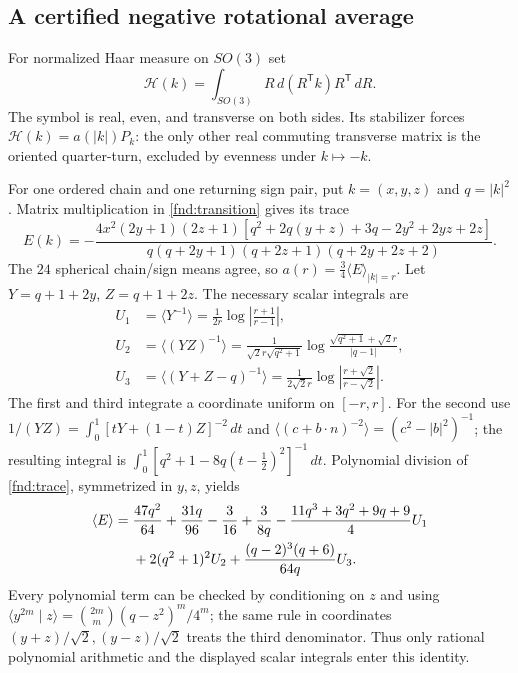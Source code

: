 \documentclass[11pt,a4paper]{amsart}
\theoremstyle{definition}
\theoremstyle{remark}
\numberwithin{equation}{section}
\begin{document}
\subsection{A certified negative rotational average}

For normalized Haar measure on $SO(3)$ set
\[
 \mathcal H(k)=\int_{SO(3)}R\,d(R^{\mathsf T}k)R^{\mathsf T}\,dR.
\]
The symbol is real, even, and transverse on both sides. Its stabilizer forces
$\mathcal H(k)=a(|k|)P_k$: the only other real commuting transverse matrix is
the oriented quarter-turn, excluded by evenness under $k\mapsto-k$.

For one ordered chain and one returning sign pair, put $k=(x,y,z)$ and $q=|k|^2$.
Matrix multiplication in \eqref{fnd:transition} gives its trace
\begin{equation}
 E(k)=-\frac{4x^2(2y+1)(2z+1)
 [q^2+2q(y+z)+3q-2y^2+2yz+2z]}
 {q(q+2y+1)(q+2z+1)(q+2y+2z+2)}.
 \label{fnd:trace}
\end{equation}
The $24$ spherical chain/sign means agree, so
$a(r)=\tfrac34\langle E\rangle_{|k|=r}$.
Let $Y=q+1+2y$, $Z=q+1+2z$. The necessary scalar integrals are
\begin{align*}
 U_1&=\langle Y^{-1}\rangle=\frac1{2r}\log\left|\frac{r+1}{r-1}\right|,\\
 U_2&=\langle(YZ)^{-1}\rangle=\frac1{\sqrt2r\sqrt{q^2+1}}
       \log\frac{\sqrt{q^2+1}+\sqrt2r}{|q-1|},\\
 U_3&=\langle(Y+Z-q)^{-1}\rangle=\frac1{2\sqrt2r}
       \log\left|\frac{r+\sqrt2}{r-\sqrt2}\right|.
\end{align*}
The first and third integrate a coordinate uniform on $[-r,r]$. For the second
use $1/(YZ)=\int_0^1[tY+(1-t)Z]^{-2}\,dt$ and
$\langle(c+b\cdot n)^{-2}\rangle=(c^2-|b|^2)^{-1}$; the resulting integral is
$\int_0^1[q^2+1-8q(t-\tfrac12)^2]^{-1}\,dt$.
Polynomial division of \eqref{fnd:trace}, symmetrized in $y,z$, yields
\begin{align}
 \langle E\rangle={}&\frac{47q^2}{64}+\frac{31q}{96}-\frac3{16}+\frac3{8q}
 -\frac{11q^3+3q^2+9q+9}{4}U_1\notag\\
 &+2(q^2+1)^2U_2+\frac{(q-2)^3(q+6)}{64q}U_3.
 \label{fnd:integration}
\end{align}
Every polynomial term can be checked by conditioning on $z$ and using
$\langle y^{2m}\mid z\rangle=\binom{2m}{m}(q-z^2)^m/4^m$; the same rule in
coordinates $(y+z)/\sqrt2,(y-z)/\sqrt2$ treats the third denominator.
Thus only rational polynomial arithmetic and the displayed scalar integrals
enter this identity.
\end{document}
